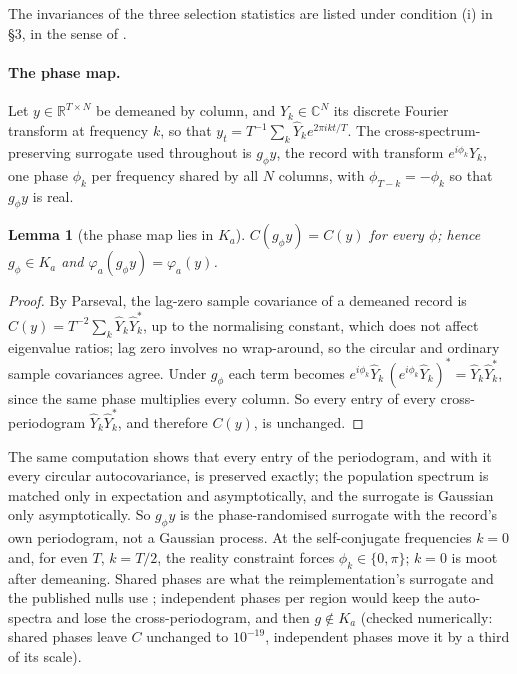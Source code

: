 \documentclass[11pt]{article}
\newtheorem{lemma}{Lemma}
\begin{document}
The invariances of the three selection statistics are listed under condition (i) in \S3, in the sense of \textcite[ch.~6]{lehmann2005}.

\paragraph{The phase map.} Let $y\in\mathbb{R}^{T\times N}$ be demeaned by column, and $\hat Y_k\in\mathbb{C}^{N}$ its discrete Fourier transform at frequency $k$, so that $y_t=T^{-1}\sum_k \hat Y_k e^{2\pi i kt/T}$. The cross-spectrum-preserving surrogate used throughout is $g_\phi y$, the record with transform $e^{i\phi_k}\hat Y_k$, one phase $\phi_k$ per frequency shared by all $N$ columns, with $\phi_{T-k}=-\phi_k$ so that $g_\phi y$ is real.
\begin{lemma}[the phase map lies in $K_a$]\label{lem:phase}
$C(g_\phi y)=C(y)$ for every $\phi$; hence $g_\phi\in K_a$ and $\varphi_a(g_\phi y)=\varphi_a(y)$.
\end{lemma}
\begin{proof}
By Parseval, the lag-zero sample covariance of a demeaned record is $C(y)=T^{-2}\sum_k \hat Y_k\hat Y_k^{*}$, up to the normalising constant, which does not affect eigenvalue ratios; lag zero involves no wrap-around, so the circular and ordinary sample covariances agree. Under $g_\phi$ each term becomes $e^{i\phi_k}\hat Y_k\,(e^{i\phi_k}\hat Y_k)^{*}=\hat Y_k\hat Y_k^{*}$, since the same phase multiplies every column. So every entry of every cross-periodogram $\hat Y_k\hat Y_k^{*}$, and therefore $C(y)$, is unchanged.
\end{proof}
The same computation shows that every entry of the periodogram, and with it every circular autocovariance, is preserved exactly; the population spectrum is matched only in expectation and asymptotically, and the surrogate is Gaussian only asymptotically. So $g_\phi y$ is the phase-randomised surrogate with the record's own periodogram, not a Gaussian process. At the self-conjugate frequencies $k=0$ and, for even $T$, $k=T/2$, the reality constraint forces $\phi_k\in\{0,\pi\}$; $k=0$ is moot after demeaning. Shared phases are what the reimplementation's surrogate and the published nulls use \parencite{hindriks2016,liegeois2017}; independent phases per region would keep the auto-spectra and lose the cross-periodogram, and then $g\notin K_a$ (checked numerically: shared phases leave $C$ unchanged to $10^{-19}$, independent phases move it by a third of its scale).
\end{document}
